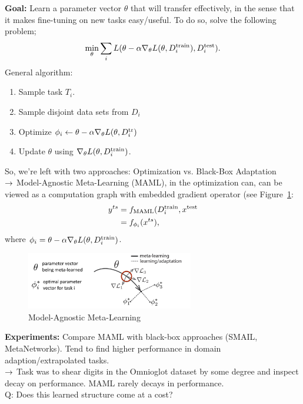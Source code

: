 {\bf Goal:} Learn a parameter vector $\theta$ that will transfer effectively, in the sense that it makes fine-tuning on new tasks easy/useful. To do so, solve the following problem;
\[
\min_\theta \sum_i L(\theta - \alpha \nabla_\theta L(\theta, D_i^{\text{train}}), D_i^{\text{test}}).
\]
General algorithm:
\begin{enumerate}
\item Sample task $T_i$.
\item Sample disjoint data sets from $D_i$
\item Optimize $\phi_i \leftarrow \theta - \alpha \nabla_\theta L(\theta, D_i^{\text{tr}})$
\item Update $\theta$ using $\nabla_\theta L(\theta, D_i^{\text{train}})$.
\end{enumerate}

So, we're left with two approaches: Optimization vs. Black-Box Adaptation \\

$\rightarrow$ Model-Agnostic Meta-Learning (MAML), in the optimization can, can be viewed as a computation graph with embedded gradient operator (see Figure~\ref{fig:maml}:
\begin{align}
 y^{ts} &= f_{\text{MAML}}(D_i^{\text{train}}, x^{\text{test}} \\
 &= f_{\phi_i}(x^{ts}),
\end{align}
where $\phi_i = \theta - \alpha \nabla_\theta L(\theta, D_i^{\text{train}})$.

\begin{figure}
    \centering
    \includegraphics[width=0.65\textwidth]{images/maml.JPG}
    \caption{Model-Agnostic Meta-Learning}
    \label{fig:maml}
\end{figure}


{\bf Experiments:} Compare MAML with black-box approaches (SMAIL, MetaNetworks). Tend to find higher performance in domain adaption/extrapolated tasks. \\
$\rightarrow$ Task was to shear digits in the Omnioglot dataset by some degree and inspect decay on performance. MAML rarely decays in performance. \\

Q: Does this learned structure come at a cost? \\

